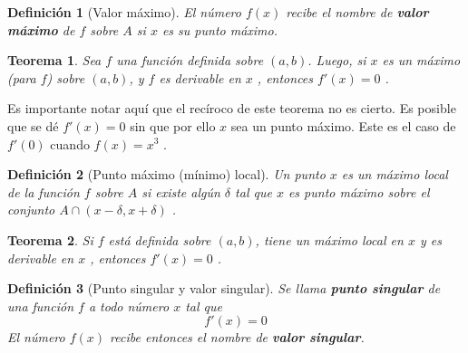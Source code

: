 \documentclass[12pt,a4paper]{extarticle}
\newtheorem{theorem}{Teorema}[section]
\newtheorem{mydef}{Definici\'on}[section]
\begin{document}
\begin{mydef}[Valor m\'aximo]
El n\'umero \( f(x) \) recibe el nombre de \textbf{valor m\'aximo} de
\( f \) sobre \( A \) si \( x \) es su punto m\'aximo.
\end{mydef}

\begin{theorem}
Sea \( f \) una funci\'on definida sobre \( (a,b) \). Luego, si \( x \)
es un m\'aximo (para \( f \)) sobre \( (a,b) \), y \( f \) es
derivable en \( x \) , entonces \( f'(x)=0 \) .
\end{theorem}
Es importante notar aqu\'i que el rec\'iroco de este teorema no es
cierto. Es posible que se d\'e \( f'(x)=0 \) sin que por ello \( x \)
sea un punto m\'aximo. Este es el caso de \( f'(0) \) cuando \(
f(x)=x^3 \) .

\begin{mydef}[Punto m\'aximo (m\'inimo) local]
Un punto \( x \) es un m\'aximo local de la funci\'on \( f \) sobre \(
A \) si existe alg\'un \( \delta \) tal que \( x \) es punto m\'aximo
sobre el conjunto \( A \cap (x-\delta, x+\delta) \) .
\end{mydef}

\begin{theorem}
Si \( f \) est\'a definida sobre \( (a,b) \), tiene un m\'aximo local
en \( x \) y es derivable en \( x \) , entonces \( f'(x)=0 \) .
\end{theorem}

\begin{mydef}[Punto singular y valor singular]
Se llama \textbf{punto singular} de una funci\'on \( f \)  a todo
n\'umero \( x \) tal que
\[ f'(x)=0 \]
El n\'umero \( f(x) \) recibe entonces el nombre de \textbf{valor singular}.
\end{mydef}
\end{document}
